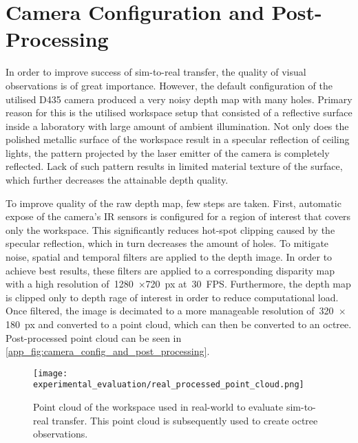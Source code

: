 \section{Camera Configuration and Post-Processing}\label{app:camera_configuration_and_postprocessing}

In order to improve success of sim-to-real transfer, the quality of visual observations is of great importance. However, the default configuration of the utilised D435 camera produced a very noisy depth map with many holes. Primary reason for this is the utilised workspace setup that consisted of a reflective surface inside a laboratory with large amount of ambient illumination. Not only does the polished metallic surface of the workspace result in a specular reflection of ceiling lights, the pattern projected by the laser emitter of the camera is completely reflected. Lack of such pattern results in limited material texture of the surface, which further decreases the attainable depth quality.

To improve quality of the raw depth map, few steps are taken. First, automatic expose of the camera's IR sensors is configured for a region of interest that covers only the workspace. This significantly reduces hot-spot clipping caused by the specular reflection, which in turn decreases the amount of holes. To mitigate noise, spatial and temporal filters are applied to the depth image. In order to achieve best results, these filters are applied to a corresponding disparity map with a high resolution of~1280~\(\times\)720~px at~30~FPS. Furthermore, the depth map is clipped only to depth rage of interest in order to reduce computational load. Once filtered, the image is decimated to a more manageable resolution of~320~\(\times\)180~px and converted to a point cloud, which can then be converted to an octree. Post-processed point cloud can be seen in \autoref{app_fig:camera_config_and_post_processing}.

\setcounter{figure}{0}
\begin{figure}[ht]
    \centering
    \texttt{[image: experimental\_evaluation/real\_processed\_point\_cloud.png]}
    \caption{Point cloud of the workspace used in real-world to evaluate sim-to-real transfer. This point cloud is subsequently used to create octree observations.}
    \label{app_fig:camera_config_and_post_processing}
\end{figure}
